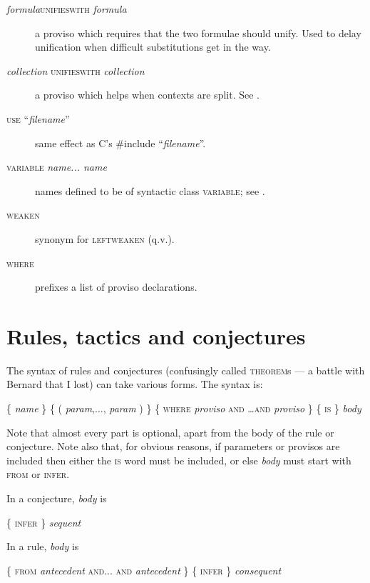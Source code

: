 \begin{description}
\item[\textit{formula}\textsc{unifieswith} \textit{formula}] a proviso which requires that the two formulae should unify. Used to delay unification when difficult substitutions get in the way.


\item[\textit{collection} \textsc{unifieswith} \textit{collection}] a proviso which helps when contexts are split. See .

\item[\textsc{use} ``\textit{filename}''] same effect as C's \#include ``\textit{filename}''.

\item[\textsc{variable} \textit{name... name}] names defined to be of syntactic class \textsc{variable}; see .

\item[\textsc{weaken}] synonym for \textsc{leftweaken} (q.v.).

\item[\textsc{where}] prefixes a list of proviso declarations.
\end{description}
 
\section{Rules, tactics and conjectures}
\label{sec:paraformlang:rulestacticsconjectures}

The syntax of rules and conjectures (confusingly called \textsc{theorem}s --- a battle with Bernard that I lost) can take various forms. The syntax is:

\{ \textit{name} \} \{ ( \textit{param},..., \textit{param} ) \} \{ \textsc{where} \textit{proviso} \textsc{and \dots and} \textit{proviso} \} \{ \textsc{is} \} \textit{body}

Note that almost every part is optional, apart from the body of the rule or conjecture. Note also that, for obvious reasons, if parameters or provisos are included then either the \textsc{is} word must be included, or else \textit{body} must start with \textsc{from} or \textsc{infer}.

In a conjecture, \textit{body} is

\{ \textsc{infer \}} \textit{sequent}

In a rule, \textit{body} is

\{ \textsc{from} \textit{antecedent} \textsc{and... and} \textit{antecedent} \} \{ \textsc{infer \}} \textit{consequent}

